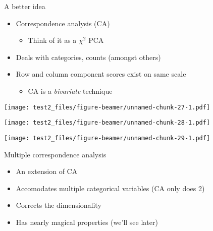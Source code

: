 \documentclass[
  ignorenonframetext,
]{beamer}
\providecommand{\tightlist}{%
  \setlength{\itemsep}{0pt}\setlength{\parskip}{0pt}}
\begin{document}
\begin{frame}{A better idea}
\protect\hypertarget{a-better-idea}{}

\begin{itemize}[<+->]
\tightlist
\item
  Correspondence analysis (CA)

  \begin{itemize}[<+->]
  \tightlist
  \item
    Think of it as a \(\chi^2\) PCA
  \end{itemize}
\item
  Deals with categories, counts (amongst others)
\item
  Row and column component scores exist on same scale

  \begin{itemize}[<+->]
  \tightlist
  \item
    CA is a \emph{bivariate} technique
  \end{itemize}
\end{itemize}

\end{frame}

\begin{frame}

\texttt{[image: test2\_files/figure-beamer/unnamed-chunk-27-1.pdf]}

\end{frame}

\begin{frame}

\texttt{[image: test2\_files/figure-beamer/unnamed-chunk-28-1.pdf]}

\end{frame}

\begin{frame}

\texttt{[image: test2\_files/figure-beamer/unnamed-chunk-29-1.pdf]}

\end{frame}

\begin{frame}{Multiple correspondence analysis}
\protect\hypertarget{multiple-correspondence-analysis}{}

\begin{itemize}[<+->]
\tightlist
\item
  An extension of CA
\item
  Accomodates multiple categorical variables (CA only does 2)
\item
  Corrects the dimensionality
\item
  Has nearly magical properties (we'll see later)
\end{itemize}

\end{frame}
\end{document}
